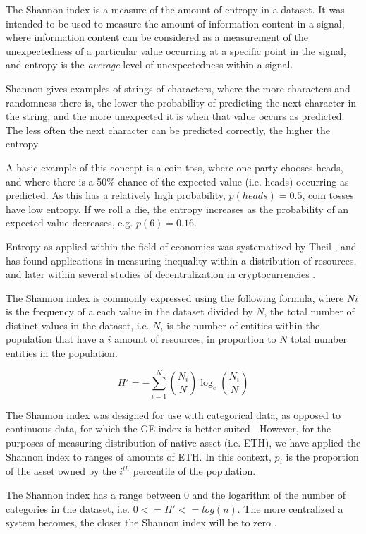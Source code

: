 \documentclass[conference]{IEEEtran}
\begin{document}
The Shannon index is a measure of the amount of entropy in a dataset.  It was intended to be used to measure the amount of information content in a signal, where information content can be considered as a measurement of the unexpectedness of a particular value occurring at a specific point in the signal, and entropy is the \textit{average} level of unexpectedness within a signal.  

Shannon gives examples of strings of characters, where the more characters and randomness there is, the lower the probability of predicting the next character in the string, and the more unexpected it is when that value occurs as predicted.  The less often the next character can be predicted correctly, the higher the entropy.

A basic example of this concept is a coin toss, where one party chooses heads, and where there is a 50\% chance of the expected value (i.e. heads) occurring as predicted.  As this has a relatively high probability, $p(heads) = 0.5$, coin tosses have low entropy. If we roll a die, the entropy increases as the probability of an expected value decreases, e.g. $p(6) = 0.16$.

Entropy as applied within the field of economics was systematized by Theil \cite{theil1967economics}, and has found applications in measuring inequality within a distribution of resources, and later within several studies of decentralization in cryptocurrencies \cite{zhang2022sok, gochhayat2020measuring, kusmierz2022centralized}.

The Shannon index is commonly expressed using the following formula, where $Ni$ is the frequency of a each value in the dataset divided by $N$, the total number of distinct values in the dataset, i.e. $N_i$ is the number of entities within the population that have a $i$ amount of resources, in proportion to $N$ total number entities in the population.

\[H' = - \sum_{i=1}^{N} \left(\frac{N_i}{N}\right) \log_{e} \left(\frac{N_i}{N}\right)\]

The Shannon index was designed for use with categorical data, as opposed to continuous data, for which the GE index is better suited \cite{tran2021harnessing}.   However, for the purposes of measuring distribution of native asset (i.e. ETH), we have applied the Shannon index to ranges of amounts of ETH.  In this context, $p_i$ is the proportion of the asset owned by the $i^{th}$ percentile of the population.

The Shannon index has a range between 0 and the logarithm of the number of categories in the dataset, i.e. $0<=H'<=log(n)$.  The more centralized a system becomes, the closer the Shannon index will be to zero \cite{kusmierz2022centralized}.
\end{document}

